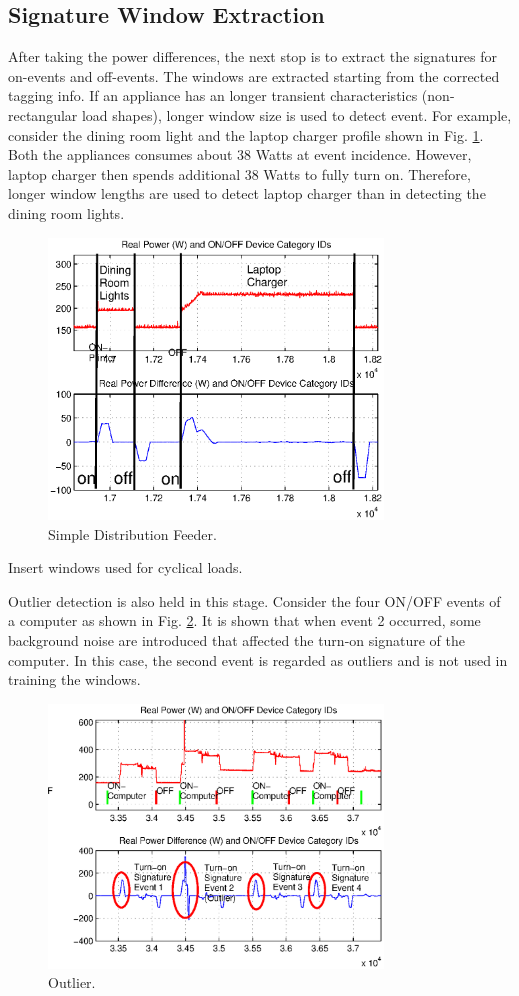 \documentclass[conference]{IEEEtran}
\begin{document}
\subsection{Signature Window Extraction}
After taking the power differences, the next stop is to extract the signatures for on-events and off-events. The windows are extracted starting from the corrected tagging info.  If an appliance has an longer transient characteristics (non-rectangular load shapes), longer window size is used to detect event.  For example, consider the dining room light and the laptop charger profile shown in Fig. \ref{fig:windowlength}.  Both the appliances consumes about 38 Watts at event incidence.  However, laptop charger then spends additional 38 Watts to fully turn on.  Therefore, longer window lengths are used to detect laptop charger than in detecting the dining room lights. 

\begin{figure}[!t]
	\centering
	\includegraphics[width=3.5in]{fig/windowlength.eps}
	\caption{Simple Distribution Feeder.}
	\label{fig:windowlength}
\end{figure}

Insert windows used for cyclical loads.

Outlier detection is also held in this stage.  Consider the four ON/OFF events of a computer as shown in Fig. \ref{fig:outlier}.  It is shown that when event 2 occurred, some background noise are introduced that affected the turn-on signature of the computer.  In this case, the second event is regarded as outliers and is not used in training the windows.

\begin{figure}[!t]
	\centering
	\includegraphics[width=3.5in]{fig/outlier.eps}
	\caption{Outlier.}
	\label{fig:outlier}
\end{figure}
\newpage
\end{document}
